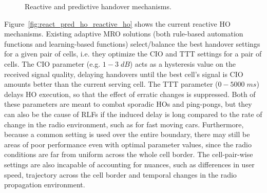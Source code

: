 			\begin{figure}[ht]
				\centering
				\caption[Reactive and predictive handover mechanisms]{Reactive and predictive handover mechanisms.}
				\label{fig:react_pred_ho}
			\end{figure}
		
			Figure~\ref{fig:react_pred_ho_reactive_ho} shows the current reactive \ac{HO} mechanisms.
			Existing adaptive \ac{MRO} solutions (both rule-based automation functions and learning-based functions) select/balance the best handover settings for a given pair of cells, i.e. they optimize the \ac{CIO} and \ac{TTT} settings for a pair of cells.
			The \ac{CIO} parameter (e.g. $1-3\;dB$) acts as a hysteresis value on the received signal quality, delaying handovers until the best cell's signal is \ac{CIO} amounts better than the current serving cell.
			The \ac{TTT} parameter ($0-5000\;ms$) delays \ac{HO} execution, so that the effect of erratic changes is suppressed.
			Both of these parameters are meant to combat sporadic \acp{HO} and ping-pongs, but they can also be the cause of \acp{RLF} if the induced delay is long compared to the rate of change in the radio environment, such as for fast moving cars.
			Furthermore, because a common setting is used over the entire boundary, there may still be areas of poor performance even with optimal parameter values, since the radio conditions are far from uniform across the whole cell border.
			The cell-pair-wise settings are also incapable of accounting for nuances, such as differences in user speed, trajectory across the cell border and temporal changes in the radio propagation environment.
			
